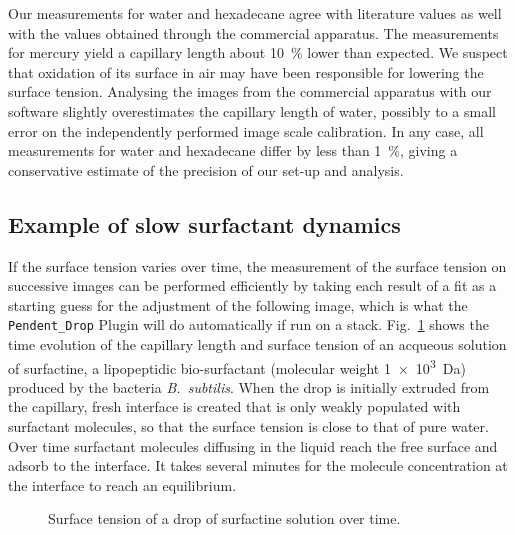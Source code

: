 \documentclass[fleqn]{scrartcl}
\newcommand{\gouttependante}{\texttt{Pendent\_Drop}\xspace}
\begin{document}
Our measurements for water and hexadecane agree with literature values
as well with the values obtained through the commercial apparatus. The
measurements for mercury yield a capillary length about
\SI{10}{\percent} lower than expected. We suspect that oxidation of
its surface in air may have been responsible for lowering the surface
tension. Analysing the images from the commercial apparatus with our
software slightly overestimates the capillary length of water,
possibly to a small error on the independently performed image scale
calibration. In any case, all measurements for water and hexadecane
differ by less than \SI{1}{\percent}, giving a conservative estimate
of the precision of our set-up and analysis.

\subsection{Example of slow surfactant dynamics}

If the surface tension varies over time, the measurement of the
surface tension on successive images can be performed efficiently by
taking each result of a fit as a starting guess for the adjustment of
the following image, which is what the \gouttependante Plugin will do
automatically if run on a stack. Fig.~\ref{fig:surfactine} shows the
time evolution of the capillary length and surface tension of an
acqueous solution of surfactine, a lipopeptidic bio-surfactant
(molecular weight \SI{1e3}{\dalton}) produced by the bacteria
\textit{B.~subtilis}. When the drop is initially extruded from the
capillary, fresh interface is created that is only weakly populated
with surfactant molecules, so that the surface tension is close to
that of pure water. Over time surfactant molecules diffusing in the
liquid reach the free surface and adsorb to the interface. It takes
several minutes for the molecule concentration at the interface to
reach an equilibrium.

\begin{figure}
  \centering
  
  \caption{Surface tension of a drop of surfactine solution over time.}
  \label{fig:surfactine}
\end{figure}
\end{document}

